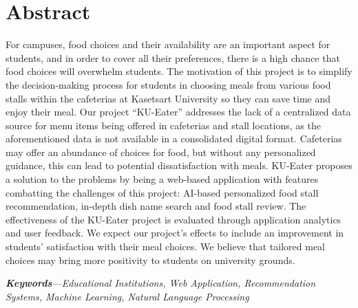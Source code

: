 \chapter*{Abstract}
\label{chap:abstract}

For campuses, food choices and their availability are an important aspect for students,
and in order to cover all their preferences, there is a high chance that food choices will overwhelm students.
The motivation of this project is to simplify the decision-making process for students in choosing meals from
various food stalls within the cafeterias at Kasetsart University so they can save time and enjoy their meal.
Our project “KU-Eater” addresses the lack of a centralized data source for menu items being offered in cafeterias and stall locations,
as the aforementioned data is not available in a consolidated digital format. Cafeterias may offer an abundance of choices for food,
but without any personalized guidance, this can lead to potential dissatisfaction with meals.
KU-Eater proposes a solution to the problems by being a web-based application with features combatting the challenges of this project:
AI-based personalized food stall recommendation, in-depth dish name search and food stall review.
The effectiveness of the KU-Eater project is evaluated through application analytics and user feedback.
We expect our project's effects to include an improvement in students' satisfaction with their meal choices.
We believe that tailored meal choices may bring more positivity to students on university grounds.
\par
\textit{\textbf{Keywords}---Educational Institutions, Web Application, Recommendation Systems, Machine Learning, Natural Language Processing}